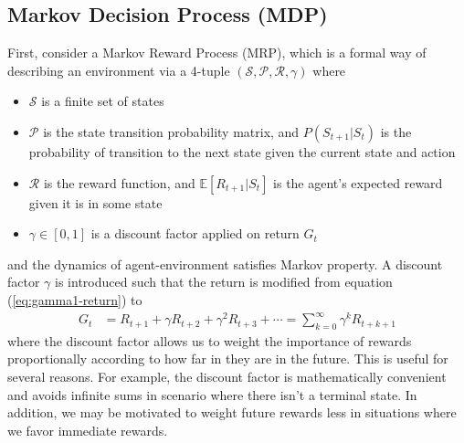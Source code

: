\documentclass[12pt]{report}
\begin{document}
\subsection{Markov Decision Process (MDP)}

First, consider a Markov Reward Process (MRP), which is a formal way of describing an environment via a 4-tuple $(\mathcal{S},\mathcal{P},\mathcal{R},\gamma)$ where
\begin{itemize}
    \item $\mathcal{S}$ is a finite set of states
    \item $\mathcal{P}$ is the state transition probability matrix, and $P(S_{t+1}|S_t)$ is the probability of transition to the next state given the current state and action
    \item $\mathcal{R}$ is the reward function, and $\mathbb{E}[R_{t+1}|S_t]$ is the agent's expected reward given it is in some state
    \item $\gamma \in [0,1]$ is a discount factor applied on return $G_t$
\end{itemize}
and the dynamics of agent-environment satisfies Markov property. A discount factor $\gamma$ is introduced such that the return is modified from equation (\ref{eq:gamma1-return}) to
\begin{align}
    G_t &= R_{t+1} + \gamma R_{t+2} + \gamma^2 R_{t+3} + \cdots = \sum_{k=0}^\infty \gamma^k R_{t+k+1} \label{eq:discounted-return}
\end{align}
where the discount factor allows us to weight the importance of rewards proportionally according to how far in they are in the future. This is useful for several reasons. For example, the discount factor is mathematically convenient and avoids infinite sums in scenario where there isn't a terminal state. In addition, we may be motivated to weight future rewards less in situations where we favor immediate rewards.\\
\end{document}
